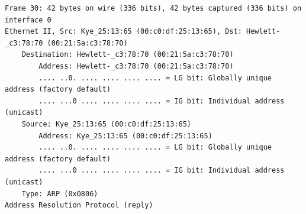 \documentclass[a4paper,11pt]{article}
\begin{document}
\begin{lstlisting}
Frame 30: 42 bytes on wire (336 bits), 42 bytes captured (336 bits) on interface 0
Ethernet II, Src: Kye_25:13:65 (00:c0:df:25:13:65), Dst: Hewlett-_c3:78:70 (00:21:5a:c3:78:70)
    Destination: Hewlett-_c3:78:70 (00:21:5a:c3:78:70)
        Address: Hewlett-_c3:78:70 (00:21:5a:c3:78:70)
        .... ..0. .... .... .... .... = LG bit: Globally unique address (factory default)
        .... ...0 .... .... .... .... = IG bit: Individual address (unicast)
    Source: Kye_25:13:65 (00:c0:df:25:13:65)
        Address: Kye_25:13:65 (00:c0:df:25:13:65)
        .... ..0. .... .... .... .... = LG bit: Globally unique address (factory default)
        .... ...0 .... .... .... .... = IG bit: Individual address (unicast)
    Type: ARP (0x0806)
Address Resolution Protocol (reply)
 
\end{lstlisting}

\lstset{showstringspaces=false,
		frame=tb,
		caption=WireShark Exp 2.2 - PC 1 }
		
\end{document}
